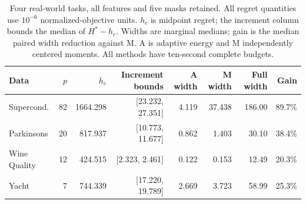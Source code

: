 \begin{table}[t]\centering\small\setlength{\tabcolsep}{4pt}
\caption{Four real-world tasks, all features and five masks retained. All regret quantities use $10^{-6}$ normalized-objective units. $h_c$ is midpoint regret; the increment column bounds the median of $H^*-h_c$. Widths are marginal medians; gain is the median paired width reduction against M. A is adaptive energy and M independently centered moments. All methods have ten-second complete budgets.}
\label{tab:public-energy-v84}
\begin{tabular}{lrrrrrrr}\toprule Data&$p$&$h_c$&Increment bounds&A width&M width&Full width&Gain\\\midrule
Supercond. & 82 & 1664.298 & [23.232, 27.351] & 4.119 & 37.438 & 186.00 & 89.7\%\\
Parkinsons & 20 & 817.937 & [10.773, 11.677] & 0.862 & 1.403 & 30.10 & 38.4\%\\
Wine Quality & 12 & 424.515 & [2.323, 2.461] & 0.122 & 0.153 & 12.49 & 20.3\%\\
Yacht & 7 & 744.339 & [17.220, 19.789] & 2.669 & 3.723 & 58.99 & 25.3\%\\
\bottomrule\end{tabular}\end{table}
